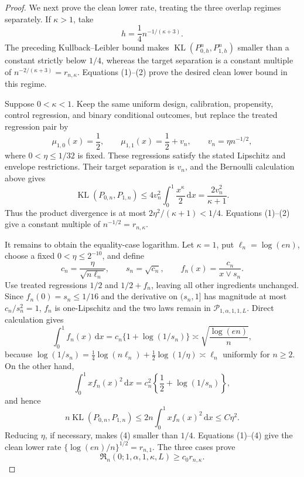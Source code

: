 \documentclass{article}
\begin{document}
\begin{proof}
We next prove the clean lower rate, treating the three overlap regimes separately. If \(\kappa>1\), take
\[
h=\frac14n^{-1/(\kappa+3)}.
\]
The preceding Kullback--Leibler bound makes \(\operatorname{KL}(P_{0,h}^n,P_{1,h}^n)\) smaller than a constant strictly below \(1/4\), whereas the target separation is a constant multiple of \(n^{-2/(\kappa+3)}=r_{n,\kappa}\). Equations (1)--(2) prove the desired clean lower bound in this regime.

Suppose \(0<\kappa<1\). Keep the same uniform design, calibration, propensity, control regression, and binary conditional outcomes, but replace the treated regression pair by
\[
\mu_{1,0}(x)=\frac12,
\qquad
\mu_{1,1}(x)=\frac12+v_n,
\qquad
v_n=\eta n^{-1/2},
\]
where \(0<\eta\leq1/32\) is fixed. These regressions satisfy the stated Lipschitz and envelope restrictions. Their target separation is \(v_n\), and the Bernoulli calculation above gives
\[
\operatorname{KL}(P_{0,n},P_{1,n})
\leq4v_n^2\int_0^1\frac{x^\kappa}{2}\,\mathrm dx
=\frac{2v_n^2}{\kappa+1}.
\]
Thus the product divergence is at most \(2\eta^2/(\kappa+1)<1/4\). Equations (1)--(2) give a constant multiple of \(n^{-1/2}=r_{n,\kappa}\).

It remains to obtain the equality-case logarithm. Let \(\kappa=1\), put \(\ell_n=\log(en)\), choose a fixed \(0<\eta\leq2^{-10}\), and define
\[
c_n=\frac{\eta}{\sqrt{n\ell_n}},
\qquad s_n=\sqrt{c_n},
\qquad
f_n(x)=\frac{c_n}{x\vee s_n}.
\]
Use treated regressions \(1/2\) and \(1/2+f_n\), leaving all other ingredients unchanged. Since \(f_n(0)=s_n\leq1/16\) and the derivative on \((s_n,1]\) has magnitude at most \(c_n/s_n^2=1\), \(f_n\) is one-Lipschitz and the two laws remain in \(\mathcal P_{1,\alpha,1,1,L}\). Direct calculation gives
\[
\int_0^1f_n(x)\,\mathrm dx
=c_n\{1+\log(1/s_n)\}
\asymp \sqrt{\frac{\log(en)}{n}},
\tag{3}
\]
because \(\log(1/s_n)=\tfrac14\log(n\ell_n)+\tfrac12\log(1/\eta)\asymp\ell_n\) uniformly for \(n\geq2\). On the other hand,
\[
\int_0^1x f_n(x)^2\,\mathrm dx
=c_n^2\left\{\frac12+\log(1/s_n)\right\},
\]
and hence
\[
n\operatorname{KL}(P_{0,n},P_{1,n})
\leq2n\int_0^1x f_n(x)^2\,\mathrm dx
\leq C\eta^2.
\tag{4}
\]
Reducing \(\eta\), if necessary, makes (4) smaller than \(1/4\). Equations (1)--(4) give the clean lower rate \(\{\log(en)/n\}^{1/2}=r_{n,1}\). The three cases prove
\[
\mathfrak R_n(0;1,\alpha,1,\kappa,L)\geq c_0r_{n,\kappa}.
\tag{5}
\]


\end{proof}
\end{document}
